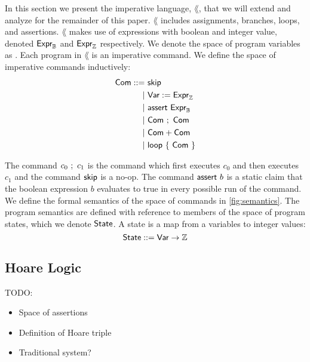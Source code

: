 \documentclass[p.tex]{subfiles}
\begin{document}
In this section we present the imperative language, $\lang$, that we will extend
and analyze for the remainder of this paper.
$\lang$ includes
assignments, branches, loops, and assertions.
%
$\lang$ makes use of expressions with boolean and integer
value, denoted $\textsf{Expr}_{\mathbb{B}}$ and $\textsf{Expr}_{\mathbb{Z}}$ respectively.
%
We denote the space of program variables as \var.
%
Each program in $\lang$ is an imperative command.
We define the space of imperative commands inductively:
\begin{align*}
  \textsf{Com} ::=&~\textsf{skip}\\
         |&~\textsf{Var}:= \textsf{Expr}_{\mathbb{Z}}\\
         |&~\textsf{assert}~\textsf{Expr}_{\mathbb{B}}\\
         |&~\textsf{Com}~;~\textsf{Com}\\
         |&~\textsf{Com} + \textsf{Com}\\
         |&~\textsf{loop}~\{~\textsf{Com}~\}
\end{align*}

The command $c_0~;~c_1$ is the command which first executes
$c_0$ and then executes $c_1$ and the command $\textsf{skip}$ is a no-op. The
command $\textsf{assert}~b$ is a static claim that the boolean expression
$b$ evaluates to true in every possible run of the command. We define
the formal semantics of the space of commands in \cref{fig:semantics}.
%
The program semantics are defined with reference to members of the
space of program states, which we denote $\textsf{State}$. A state
is a map from a variables to integer values:
%
\[\textsf{State} ::= \textsf{Var} \rightarrow \mathbb{Z}\]

\subsection{Hoare Logic}

TODO:
\begin{itemize}
  \item Space of assertions
  \item Definition of Hoare triple
  \item Traditional system?
\end{itemize}
\end{document}
